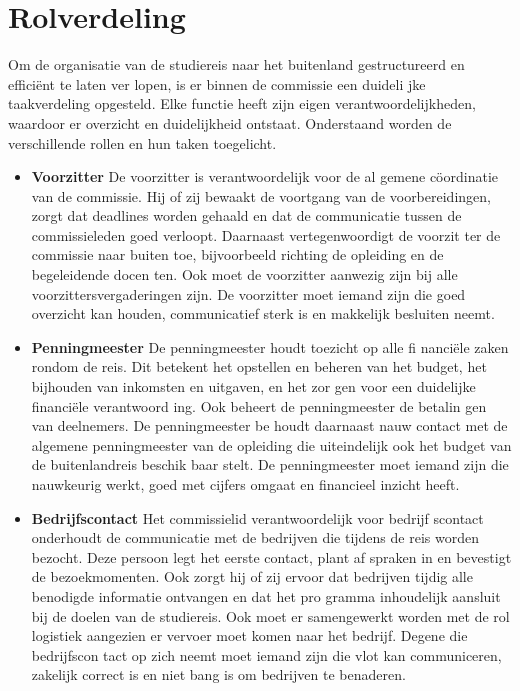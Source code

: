 \section{Rolverdeling}
Om de organisatie van de studiereis naar het
buitenland gestructureerd en efficiënt te laten ver
lopen, is er binnen de commissie een duideli
jke taakverdeling opgesteld. Elke functie heeft zijn
eigen verantwoordelijkheden, waardoor er overzicht
en duidelijkheid ontstaat. Onderstaand worden de
verschillende rollen en hun taken toegelicht.

\begin{itemize}
	\item \textbf{Voorzitter} De voorzitter is verantwoordelijk voor de al
	gemene cöordinatie van de commissie. Hij of zij
	bewaakt de voortgang van de voorbereidingen,
	zorgt dat deadlines worden gehaald en dat de
	communicatie tussen de commissieleden goed
	verloopt. Daarnaast vertegenwoordigt de voorzit
	ter de commissie naar buiten toe, bijvoorbeeld
	richting de opleiding en de begeleidende docen
	ten. Ook moet de voorzitter aanwezig zijn bij
	alle voorzittersvergaderingen zijn. De voorzitter
	moet iemand zijn die goed overzicht kan houden,
	communicatief sterk is en makkelijk besluiten
	neemt.
	
	\vspace{1cm}
	
	\item \textbf{Penningmeester} De penningmeester houdt toezicht op alle fi
	nanciële zaken rondom de reis. Dit betekent
	het opstellen en beheren van het budget, het
	bijhouden van inkomsten en uitgaven, en het zor
	gen voor een duidelijke financiële verantwoord
	ing. Ook beheert de penningmeester de betalin
	gen van deelnemers. De penningmeester be
	houdt daarnaast nauw contact met de algemene penningmeester van de opleiding die uiteindelijk
	ook het budget van de buitenlandreis beschik
	baar stelt. De penningmeester moet iemand zijn
	die nauwkeurig werkt, goed met cijfers omgaat
	en financieel inzicht heeft.
	
	\newpage
	
	\item \textbf{Bedrijfscontact} Het commissielid verantwoordelijk voor bedrijf
	scontact onderhoudt de communicatie met de
	bedrijven die tijdens de reis worden bezocht.
	Deze persoon legt het eerste contact, plant af
	spraken in en bevestigt de bezoekmomenten.
	Ook zorgt hij of zij ervoor dat bedrijven tijdig alle
	benodigde informatie ontvangen en dat het pro
	gramma inhoudelijk aansluit bij de doelen van de
	studiereis. Ook moet er samengewerkt worden
	met de rol logistiek aangezien er vervoer moet
	komen naar het bedrijf. Degene die bedrijfscon
	tact op zich neemt moet iemand zijn die vlot kan
	communiceren, zakelijk correct is en niet bang is
	om bedrijven te benaderen.
	

\end{itemize}
